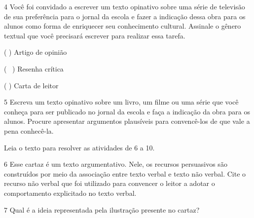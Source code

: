 \num{4} Você foi convidado a escrever um texto opinativo sobre uma série
de televisão de sua preferência para o jornal da escola e fazer a
indicação dessa obra para os alunos como forma de enriquecer seu
conhecimento cultural. Assinale o gênero textual que você precisará
escrever para realizar essa tarefa.

\begin{boxlist}

\boxitem( ) Artigo de opinião

\boxitem(~ ) Resenha crítica

\boxitem( ) Carta de leitor

\end{boxlist}

\num{5} Escreva um texto opinativo sobre um livro, um filme ou uma série
que você conheça para ser publicado no jornal da escola e faça a
indicação da obra para os alunos. Procure apresentar argumentos
plausíveis para convencê-los de que vale a pena conhecê-la.


Leia o texto para resolver as atividades de 6 a 10.


\num{6} Esse cartaz é um texto argumentativo. Nele, os recursos
persuasivos são construídos por meio da associação entre texto verbal e
texto não verbal. Cite o recurso não verbal que foi utilizado para
convencer o leitor a adotar o comportamento explicitado no texto verbal.


\num{7} Qual é a ideia representada pela ilustração presente no cartaz?


